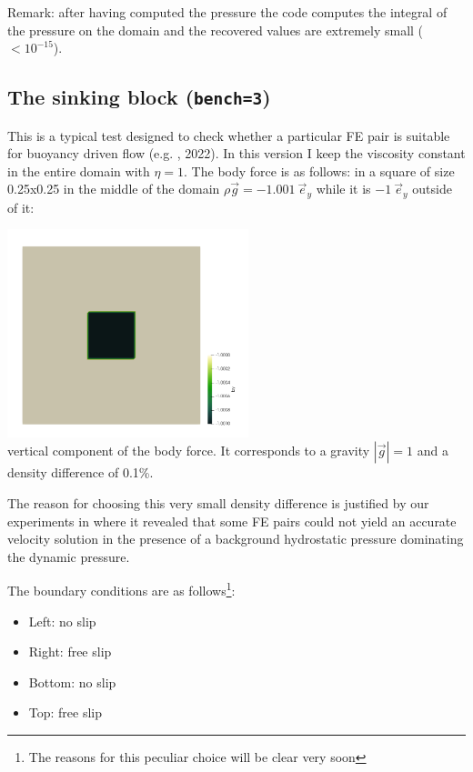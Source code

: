 Remark: after having computed the pressure the code computes the integral of the pressure 
on the domain and the recovered values are extremely small ($<10^{-15}$).  

\subsection*{The sinking block ({\tt bench=3})}

This is a typical test designed to check whether a particular 
FE pair is suitable for buoyancy driven flow (e.g. \textcite{thba22}, 2022).
In this version I keep the viscosity constant in the entire domain with $\eta=1$.
The body force is as follows: in a square of size 0.25x0.25 in the middle of the domain
$\rho \vec{g}=-1.001~\vec{e}_y$ while it is $-1~\vec{e}_y$ outside of it:

\begin{center}
\includegraphics[width=7cm]{python_codes/fieldstone_161/results/bench3/by}\\
{\captionfont vertical component of the body force. 
It corresponds to a gravity $|\vec{g}|=1$
and a density difference of 0.1\%.}
\end{center}

The reason for choosing this very small density difference is justified by our 
experiments in \textcite{thba22} where it revealed that some FE pairs could not yield 
an accurate velocity solution in the presence of a background hydrostatic pressure
dominating the dynamic pressure. 

The boundary conditions are as follows\footnote{The reasons for this 
peculiar choice will be clear very soon}:
\begin{itemize}
\item Left: no slip
\item Right: free slip
\item Bottom: no slip
\item Top: free slip
\end{itemize}

